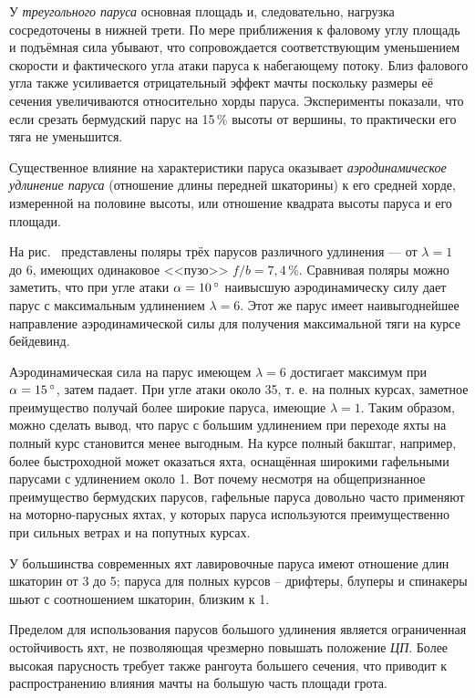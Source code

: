 У \textit{треугольного паруса} основная площадь и,
следовательно, нагрузка сосредоточены в нижней трети. По мере
приближения к фаловому углу площадь и подъёмная сила убывают, что
сопровождается соответствующим уменьшением скорости и фактического
угла атаки паруса к набегающему потоку. Близ фалового угла также
усиливается отрицательный эффект мачты поскольку размеры её сечения
увеличиваются относительно хорды паруса. Эксперименты показали, что
если срезать бермудский парус на 15\,\% высоты от вершины, то
практически его тяга не уменьшится.

Существенное влияние на характеристики паруса оказывает
\textit{аэродинамическое удлинение паруса}
(отношение длины передней шкаторины) к его средней хорде,
измеренной на половине высоты, или отношение квадрата высоты паруса и
его площади.

На рис.~ представлены поляры трёх парусов различного удлинения
--- от $\lambda = 1$ до 6, имеющих одинаковое <<пузо>>
$f/b=7,4\,\%$. Сравнивая поляры можно заметить, что при угле атаки
$\alpha = 10\,^\circ$ наивысшую аэродинамическу силу дает парус с
максимальным удлинением $\lambda = 6$. Этот же парус имеет
наивыгоднейшее направление аэродинамической силы для получения
максимальной тяги на курсе бейдевинд.

Аэродинамическая сила на парус имеющем $\lambda = 6$ достигает
максимум при $\alpha = 15\,^\circ$, затем падает. При угле атаки около
35\gr, т. е. на полных курсах, заметное преимущество получай более
широкие паруса, имеющие $\lambda = 1$. Таким образом, можно сделать
вывод, что парус с большим удлинением при переходе яхты на полный курс
становится менее выгодным. На курсе полный бакштаг, например, более
быстроходной может оказаться яхта, оснащённая широкими гафельными
парусами с удлинением около 1. Вот почему несмотря на общепризнанное
преимущество бермудских парусов, гафельные паруса довольно часто
применяют на моторно-парусных яхтах, у которых паруса используются
преимущественно при сильных ветрах и на попутных курсах.

У большинства современных яхт лавировочные паруса имеют отношение длин
шкаторин от 3 до 5; паруса для полных курсов \--- дрифтеры, блуперы и
спинакеры шьют с соотношением шкаторин, близким к 1.

Пределом для использования парусов большого удлинения является
ограниченная остойчивость яхт, не позволяющая чрезмерно повышать
положение \textit{ЦП}. Более высокая парусность требует также рангоута
большего сечения, что приводит к распространению влияния мачты на
большую часть площади грота.

